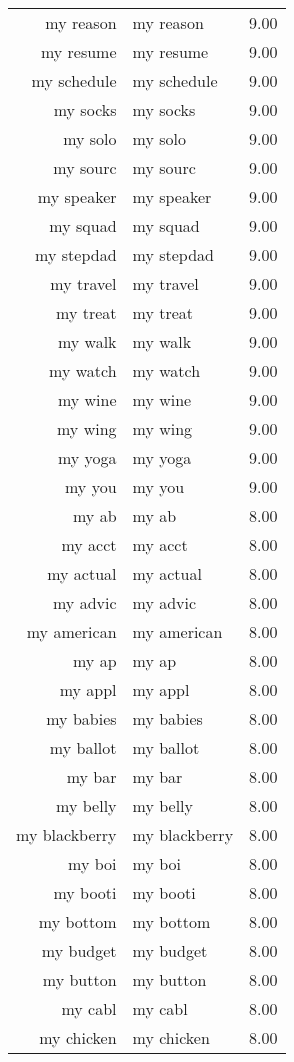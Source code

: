 \begin{table}[ht]
\begin{tabular}{rlr}
  my reason & my reason & 9.00 \\ 
  my resume & my resume & 9.00 \\ 
  my schedule & my schedule & 9.00 \\ 
  my socks & my socks & 9.00 \\ 
  my solo & my solo & 9.00 \\ 
  my sourc & my sourc & 9.00 \\ 
  my speaker & my speaker & 9.00 \\ 
  my squad & my squad & 9.00 \\ 
  my stepdad & my stepdad & 9.00 \\ 
  my travel & my travel & 9.00 \\ 
  my treat & my treat & 9.00 \\ 
  my walk & my walk & 9.00 \\ 
  my watch & my watch & 9.00 \\ 
  my wine & my wine & 9.00 \\ 
  my wing & my wing & 9.00 \\ 
  my yoga & my yoga & 9.00 \\ 
  my you & my you & 9.00 \\ 
  my ab & my ab & 8.00 \\ 
  my acct & my acct & 8.00 \\ 
  my actual & my actual & 8.00 \\ 
  my advic & my advic & 8.00 \\ 
  my american & my american & 8.00 \\ 
  my ap & my ap & 8.00 \\ 
  my appl & my appl & 8.00 \\ 
  my babies & my babies & 8.00 \\ 
  my ballot & my ballot & 8.00 \\ 
  my bar & my bar & 8.00 \\ 
  my belly & my belly & 8.00 \\ 
  my blackberry & my blackberry & 8.00 \\ 
  my boi & my boi & 8.00 \\ 
  my booti & my booti & 8.00 \\ 
  my bottom & my bottom & 8.00 \\ 
  my budget & my budget & 8.00 \\ 
  my button & my button & 8.00 \\ 
  my cabl & my cabl & 8.00 \\ 
  my chicken & my chicken & 8.00 \\ 

\end{tabular}
\end{table}
